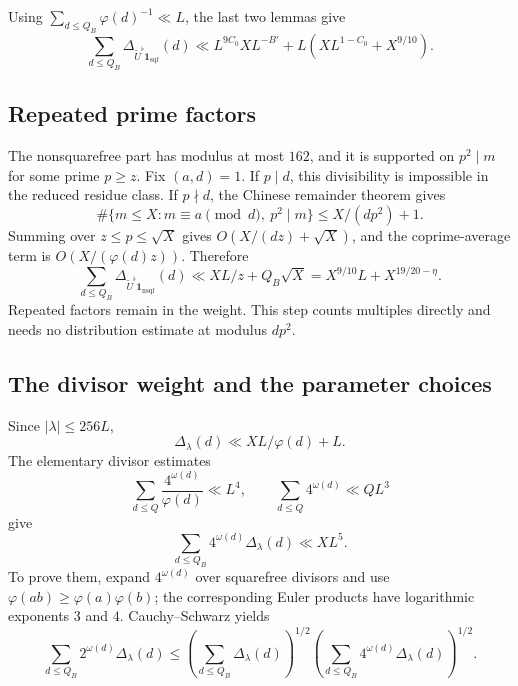 \documentclass{amsart}
\newcounter{fact}
\numberwithin{equation}{section}
\numberwithin{table}{section}
\newcommand{\ind}{\mathbf 1}
\begin{document}
Using $\sum_{d\le Q_B}\varphi(d)^{-1}\ll L$, the last two lemmas give
\begin{equation}\label{eq:squarefree-BV}
\sum_{d\le Q_B}\Delta_{\widetilde U^\flat\ind_{\mathrm{sqf}}}(d)
\ll L^{9C_0}XL^{-B'}+L(XL^{1-C_0}+X^{9/10}).
\end{equation}

\subsection{Repeated prime factors}

The nonsquarefree part has modulus at most $162$, and it is supported on
$p^2\mid m$ for some prime $p\ge z$. Fix $(a,d)=1$.
If $p\mid d$, this divisibility is impossible in the reduced residue
class. If $p\nmid d$, the Chinese remainder theorem gives
\[
\#\{m\le X:m\equiv a\pmod d,\ p^2\mid m\}
\le X/(dp^2)+1.
\]
Summing over $z\le p\le\sqrt X$ gives $O(X/(dz)+\sqrt X)$, and the
coprime-average term is $O(X/(\varphi(d)z))$. Therefore
\begin{equation}\label{eq:nonsquarefree-BV}
\sum_{d\le Q_B}\Delta_{\widetilde U^\flat\ind_{\mathrm{nsqf}}}(d)
\ll XL/z+Q_B\sqrt X
=X^{9/10}L+X^{19/20-\eta}.
\end{equation}
Repeated factors remain in the weight. This step counts multiples
directly and needs no distribution estimate at modulus $dp^2$.

\subsection{The divisor weight and the parameter choices}

Since $|\lambda|\le256L$,
\[
\Delta_\lambda(d)\ll XL/\varphi(d)+L.
\]
The elementary divisor estimates
\[
\sum_{d\le Q}\frac{4^{\omega(d)}}{\varphi(d)}\ll L^4,
\qquad
\sum_{d\le Q}4^{\omega(d)}\ll QL^3
\]
give
\begin{equation}\label{eq:four-omega}
\sum_{d\le Q_B}4^{\omega(d)}\Delta_\lambda(d)\ll XL^5.
\end{equation}
To prove them, expand $4^{\omega(d)}$ over squarefree divisors and use
$\varphi(ab)\ge\varphi(a)\varphi(b)$; the corresponding Euler products
have logarithmic exponents $3$ and $4$. Cauchy--Schwarz yields
\begin{equation}\label{eq:divisor-CS}
\sum_{d\le Q_B}2^{\omega(d)}\Delta_\lambda(d)
\le\left(\sum_{d\le Q_B}\Delta_\lambda(d)\right)^{1/2}
\left(\sum_{d\le Q_B}4^{\omega(d)}\Delta_\lambda(d)\right)^{1/2}.
\end{equation}
\end{document}
